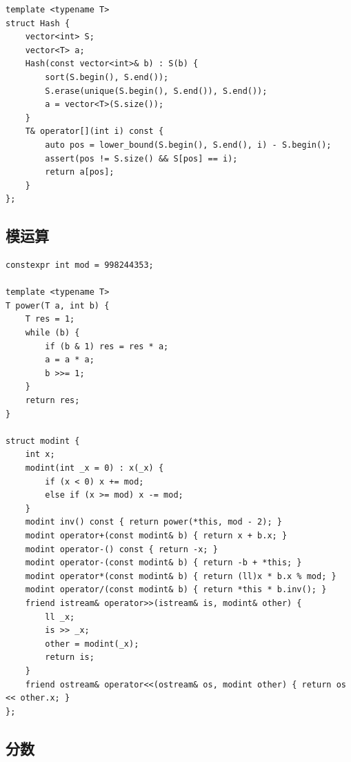 \documentclass[UTF8, twoside]{ctexart}
\begin{document}
\begin{sloppypar}
\begin{lstlisting}[style=cpp]
template <typename T>
struct Hash {
    vector<int> S;
    vector<T> a;
    Hash(const vector<int>& b) : S(b) {
        sort(S.begin(), S.end());
        S.erase(unique(S.begin(), S.end()), S.end());
        a = vector<T>(S.size());
    }
    T& operator[](int i) const {
        auto pos = lower_bound(S.begin(), S.end(), i) - S.begin();
        assert(pos != S.size() && S[pos] == i);
        return a[pos];
    }
};
\end{lstlisting}

\subsection{模运算}

\begin{lstlisting}[style=cpp]
constexpr int mod = 998244353;

template <typename T>
T power(T a, int b) {
    T res = 1;
    while (b) {
        if (b & 1) res = res * a;
        a = a * a;
        b >>= 1;
    }
    return res;
}

struct modint {
    int x;
    modint(int _x = 0) : x(_x) {
        if (x < 0) x += mod;
        else if (x >= mod) x -= mod;
    }
    modint inv() const { return power(*this, mod - 2); }
    modint operator+(const modint& b) { return x + b.x; }
    modint operator-() const { return -x; }
    modint operator-(const modint& b) { return -b + *this; }
    modint operator*(const modint& b) { return (ll)x * b.x % mod; }
    modint operator/(const modint& b) { return *this * b.inv(); }
    friend istream& operator>>(istream& is, modint& other) {
        ll _x;
        is >> _x;
        other = modint(_x);
        return is;
    }
    friend ostream& operator<<(ostream& os, modint other) { return os << other.x; }
};
\end{lstlisting}

\subsection{分数}


\end{sloppypar}
\end{document}
